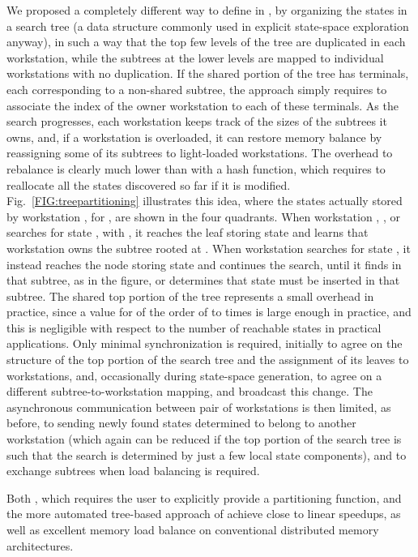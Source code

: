 \documentclass[copyright,creativecommons]{eptcs}
\begin{document}
We proposed a completely different way to define  in
\cite{1997JPDC-AutomaticDistrGen}, by organizing the states
in a search tree (a data structure commonly used in
explicit state-space exploration anyway), in such a way that the top
few levels of the tree are duplicated in each workstation, while the
subtrees at the lower levels are mapped to individual workstations
with no duplication. If the shared portion of the tree has 
terminals, each corresponding to a non-shared subtree, the approach
simply requires to associate the index of the owner workstation to
each of these terminals. As the search progresses, each workstation
keeps track of the sizes of the subtrees it owns,
and, if a workstation is overloaded, it can
restore memory balance by reassigning some of its subtrees to
light-loaded workstations.
The overhead to rebalance is clearly much
lower than with a hash function, which requires
to reallocate all the states discovered so far if it is modified.
Fig.~\ref{FIG:treepartitioning} illustrates this
idea, where the states actually stored by workstation , for , are shown in the four quadrants.
When workstation , , or  searches for state ,
with , it reaches the leaf storing state  and learns
that workstation  owns the subtree rooted at .
When workstation  searches for state , it instead reaches the
node storing state  and continues the search, until it finds  in that
subtree, as in the figure, or determines that state  must be
inserted in that subtree.
The shared top portion of the tree represents a small overhead in
practice, since a value for  of the order of  to  times
 is large enough in practice, and this is negligible with respect
to the number of reachable states in practical applications.
Only minimal synchronization is required, initially to agree on the
structure of the top portion of the search tree and the assignment
of its leaves to workstations, and, occasionally during state-space
generation, to agree on a different subtree-to-workstation mapping,
and broadcast this change.
The asynchronous communication between pair of workstations is then limited, as
before, to sending newly found states determined to belong to
another workstation (which again can be reduced if the top portion
of the search tree is such that the search is determined by just a
few local state components), and to exchange subtrees when load
balancing is required.

Both \cite{1998INFORMSJC-DistrGen}, which requires the user to explicitly
provide a partitioning function, and the more automated
tree-based approach of \cite{1997JPDC-AutomaticDistrGen}
achieve close to linear speedups, as well as excellent memory load balance
on conventional distributed memory architectures.
\end{document}
